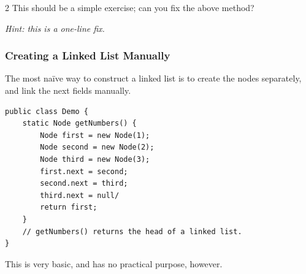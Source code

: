\documentclass[./main.tex]{subfiles}
\begin{document}
\begin{figure}[htbp]
    \centering
\end{figure}

\begin{tryitbox}{2}
    This should be a simple exercise; can you fix the above method?

    \emph{Hint: this is a one-line fix.}
\end{tryitbox}

\subsubsection{Creating a Linked List Manually}

The most naïve way to construct a linked list is to create the nodes separately, and link the next fields manually.

\begin{verbatim}
public class Demo {
    static Node getNumbers() {
        Node first = new Node(1);
        Node second = new Node(2);
        Node third = new Node(3);
        first.next = second;
        second.next = third;
        third.next = null/
        return first;
    }
    // getNumbers() returns the head of a linked list.
}
\end{verbatim}

This is very basic, and has no practical purpose, however.
\end{document}
